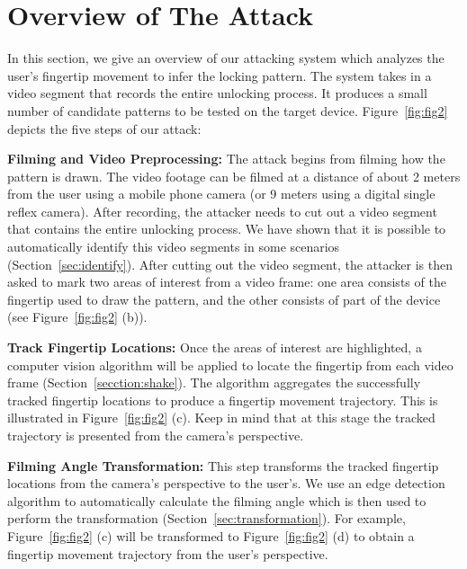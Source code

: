\section{Overview of The Attack}
\label{section:overview}
    In this section, we give an overview of our attacking system which analyzes the user's fingertip movement to infer the locking pattern. The system takes in a video segment that records the entire unlocking process. It produces a small number of candidate patterns to be tested on the target device.
    Figure~\ref{fig:fig2} depicts the five steps of our attack:

    \vspace{2mm}
    \noindent {} \textbf{Filming and Video Preprocessing:} The attack begins from
        filming how the pattern is drawn. The video footage can be filmed at a distance of
        about 2 meters from the user using a mobile phone camera (or 9 meters using a digital single reflex camera). After recording, the attacker
        needs to cut out a video segment that contains the entire unlocking
        process. We have shown that it is possible to automatically identify this video segments in some scenarios (Section~\ref{sec:identify}).
        After cutting out the video segment, the attacker is then asked to mark two areas of interest from a video frame: one area consists of
        the fingertip used to draw the pattern, and the other consists of part of the device (see
    Figure~\ref{fig:fig2} (b)).

     \vspace{2mm}
    \noindent {}  \textbf{Track Fingertip Locations:} Once the areas of interest are highlighted, a computer vision algorithm will be applied
        to locate the fingertip from each video frame (Section~\ref{secction:shake}). The algorithm aggregates the successfully tracked fingertip locations to produce a fingertip movement trajectory.
        This is illustrated in Figure~\ref{fig:fig2} (c). Keep in mind that at this stage the tracked trajectory is presented from the camera's perspective.

     \vspace{2mm}
    \noindent {} \textbf{Filming Angle Transformation:}  This step transforms the tracked fingertip locations from the camera's perspective to the user's.
    We use an edge detection algorithm to automatically calculate the filming angle which is then used to perform the transformation (Section~\ref{sec:transformation}).
    For example, Figure~\ref{fig:fig2} (c) will be transformed to Figure~\ref{fig:fig2} (d) to obtain a fingertip movement trajectory from the user's perspective.

